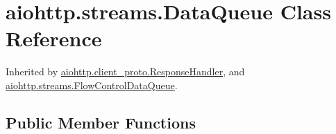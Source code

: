 \hypertarget{classaiohttp_1_1streams_1_1_data_queue}{}\section{aiohttp.\+streams.\+Data\+Queue Class Reference}
\label{classaiohttp_1_1streams_1_1_data_queue}


Inherited by \hyperlink{classaiohttp_1_1client__proto_1_1_response_handler}{aiohttp.\+client\+\_\+proto.\+Response\+Handler}, and \hyperlink{classaiohttp_1_1streams_1_1_flow_control_data_queue}{aiohttp.\+streams.\+Flow\+Control\+Data\+Queue}.

\subsection*{Public Member Functions}
